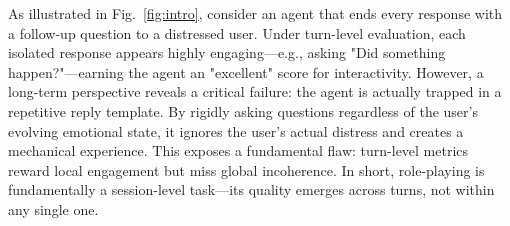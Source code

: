 As illustrated in Fig.~\ref{fig:intro}, consider an agent that ends every response with a follow-up question to a distressed user. Under turn-level evaluation, each isolated response appears highly engaging—e.g., asking "Did something happen?"—earning the agent an "excellent" score for interactivity.  However, a long-term perspective reveals a critical failure: the agent is actually trapped in a repetitive reply template. By rigidly asking questions regardless of the user's evolving emotional state, it ignores the user's actual distress and creates a mechanical experience. This exposes a fundamental flaw: turn-level metrics reward local engagement but miss global incoherence. In short, role-playing is fundamentally a session-level task—its quality emerges across turns, not within any single one.


